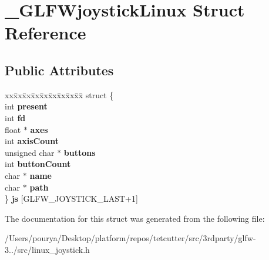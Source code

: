 \hypertarget{struct__GLFWjoystickLinux}{}\section{\+\_\+\+G\+L\+F\+Wjoystick\+Linux Struct Reference}
\label{struct__GLFWjoystickLinux}
\subsection*{Public Attributes}
\begin{DoxyCompactItemize}
\item 
\hypertarget{struct__GLFWjoystickLinux_ab3d0e82435c80c470ad7602aaa157d5b}{}\begin{tabbing}
xx\=xx\=xx\=xx\=xx\=xx\=xx\=xx\=xx\=\kill
struct \{\\
\>int {\bfseries present}\\
\>int {\bfseries fd}\\
\>float $\ast$ {\bfseries axes}\\
\>int {\bfseries axisCount}\\
\>unsigned char $\ast$ {\bfseries buttons}\\
\>int {\bfseries buttonCount}\\
\>char $\ast$ {\bfseries name}\\
\>char $\ast$ {\bfseries path}\\
\} {\bfseries js} \mbox{[}GLFW\_JOYSTICK\_LAST+1\mbox{]}\label{struct__GLFWjoystickLinux_ab3d0e82435c80c470ad7602aaa157d5b}
\\

\end{tabbing}\end{DoxyCompactItemize}


The documentation for this struct was generated from the following file\+:\begin{DoxyCompactItemize}
\item 
/\+Users/pourya/\+Desktop/platform/repos/tetcutter/src/3rdparty/glfw-\/3../src/linux\+\_\+joystick.\+h\end{DoxyCompactItemize}
